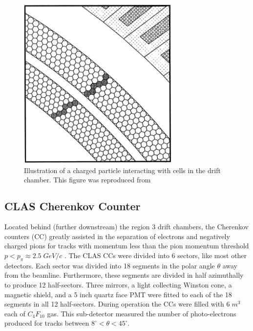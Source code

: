 \begin{figure}
	\centering
		\includegraphics[width=8cm]{image/diagrams/dc-hexagonal-cells.png}
		\caption{Illustration of a charged particle interacting with cells in the drift chamber.  This figure was reproduced from \cite{hardware-mestayer:2001}}
\end{figure}
    
\subsection{CLAS Cherenkov Counter}
Located behind (further downstream) the region 3 drift chambers, the Cherenkov counters (CC) greatly assisted in the separation of electrons and negatively charged pions for tracks with momentum less than the pion momentum threshold $p < p_{\pi} \approx 2.5 \; GeV/c$ \cite{hardware-adams:2001}.  The CLAS CCs were divided into 6 sectors, like most other detectors.  Each sector was divided into 18 segments in the polar angle $\theta$ away from the beamline.  Furthermore, these segments are divided in half azimuthally to produce 12 half-sectors.  Three mirrors, a light collecting Winston cone, a magnetic shield, and a 5 inch quartz face PMT were fitted to each of the 18 segments in all 12 half-sectors.  During operation the CCs were filled with $6 \; m^3$ each of $C_{4} F_{10}$ gas.  This sub-detector measured the number of photo-electrons produced for tracks between $8^\circ < \theta < 45^\circ$.  

